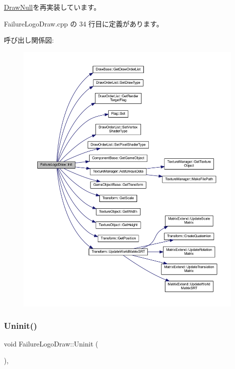 \mbox{\hyperlink{class_draw_null_acd7fef3ccea1da537ac9507ffbb6dd2e}{Draw\+Null}}を再実装しています。



 Failure\+Logo\+Draw.\+cpp の 34 行目に定義があります。

呼び出し関係図\+:\nopagebreak
\begin{figure}[H]
\begin{center}
\leavevmode
\includegraphics[width=350pt]{class_failure_logo_draw_a718d587edcabb1feea72153a79a65176_cgraph}
\end{center}
\end{figure}
\mbox{\label{class_failure_logo_draw_a97646253380b54f37565650e211f33cd}} 
\subsubsection{\texorpdfstring{Uninit()}{Uninit()}}
{\footnotesize\ttfamily void Failure\+Logo\+Draw\+::\+Uninit (\begin{DoxyParamCaption}{ }\end{DoxyParamCaption})\hspace{0.3cm}{\ttfamily [override]}, {\ttfamily [virtual]}}



